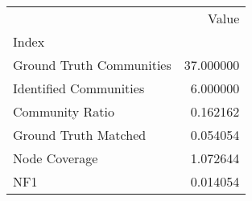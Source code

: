 \begin{tabular}{lr}
\toprule
{} &      Value \\
Index                    &            \\
\midrule
Ground Truth Communities &  37.000000 \\
Identified Communities   &   6.000000 \\
Community Ratio          &   0.162162 \\
Ground Truth Matched     &   0.054054 \\
Node Coverage            &   1.072644 \\
NF1                      &   0.014054 \\
\bottomrule
\end{tabular}
